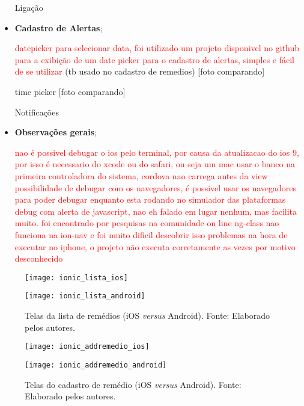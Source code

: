 \begin{itemize}
 	Ligação
 	
 	
 	\item \textbf{Cadastro de Alertas};
 	
 	\textcolor{red}{datepicker para selecionar data, foi utilizado um projeto disponivel no github para a exibição de um date picker para o cadastro de alertas, simples e fácil de se utilizar} (tb usado no cadastro de remedios) [foto comparando]
 	
 	time picker [foto comparando]
 	
 	Notificações
 	
 	
 	\item \textbf{Observações gerais}; 	
 	
 	\textcolor{red}{nao é possivel debugar o ios pelo terminal, por causa da atualizacao do ios 9, por isso é necessario do xcode ou do safari, ou seja um mac}
 	\textcolor{red}{usar o banco na primeira controladora do sistema, cordova nao carrega antes da view}
 	\textcolor{red}{possibilidade de debugar com os navegadores, é possivel usar os navegadores para poder debugar enquanto esta rodando no simulador das plataformas}
 	\textcolor{red}{debug com alerta de javascript, nao eh falado em lugar nenhum, mas facilita muito. foi encontrado por pesquisas na comunidade on line}
 	\textcolor{red}{ng-class nao funciona na ion-nav e foi muito dificil descobrir isso}
 	\textcolor{red}{problemas na hora de executar no iphone, o projeto não executa corretamente as vezes por motivo desconhecido}
 	
 \end{itemize} 
 
 \begin{figure}
 	\centering
 	\begin{minipage}{.5\textwidth}
 		\centering
 		\texttt{[image: ionic\_lista\_ios]}
 	\end{minipage}%
 	\begin{minipage}{.5\textwidth}
 		\centering
 		\texttt{[image: ionic\_lista\_android]}
 	\end{minipage}
  \caption[Telas da lista de remédios (iOS \textit{versus} Android)]{ Telas da lista de remédios (iOS \textit{versus} Android). Fonte: Elaborado pelos autores.}
  \label{fig:ionic_lista}
 \end{figure}

 \begin{figure}
 	\centering
 	\begin{minipage}{.5\textwidth}
 		\centering
 		\texttt{[image: ionic\_addremedio\_ios]}
 	\end{minipage}%
 	\begin{minipage}{.5\textwidth}
 		\centering
 		\texttt{[image: ionic\_addremedio\_android]}
 	\end{minipage}
 	\caption[Telas do cadastro de remédio (iOS \textit{versus} Android)]{ Telas do cadastro de remédio (iOS \textit{versus} Android). Fonte: Elaborado pelos autores.}
 	\label{fig:ionic_addremedio}
 \end{figure}

